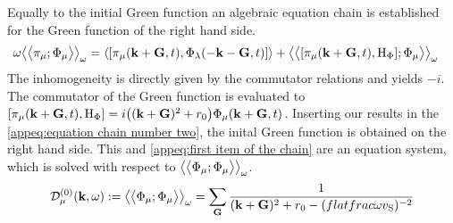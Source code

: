 %
Equally to the initial Green function an algebraic equation chain is established for the Green function of the right hand side.
%
\begin{align}
	\omega \green{\pi_{\mu}}{\Phi_{\mu}}_{\omega} &= 
		\expval{\comm{\pi_{\mu}(\vb{k}+\vb{G},t)}{\Phi_{\lambda}(-\vb{k}-\vb{G},t)}}
		+
		\green{\comm{\pi_{\mu}(\vb{k}+\vb{G},t)}{\mt{H}_{\Phi}}}{\Phi_{\mu}}_{\omega}
	\label{appeq:equation chain number two}
\end{align}
%
The inhomogeneity is directly given by the commutator relations and yields $-i$.
The commutator of the Green function is evaluated to $\comm{\pi_{\mu}(\vb{k}+\vb{G},t)}{\mt{H}_{\Phi}} = i \big((\vb{k}+\vb{G})^{2} + r_{0}\big) \Phi_{\mu}(\vb{k}+\vb{G},t)$.
Inserting our results in the \eqref{appeq:equation chain number two}, the inital Green function is obtained on the right hand side.
This and \eqref{appeq:first item of the chain} are an equation system, which is solved with respect to $\big\langle\big\langle{\Phi_{\mu}};{\Phi_{\mu}}\big\rangle\big\rangle_{\omega}$.
%
\begin{align}
	\mathcal{D}_{\mu}^{(0)}(\vb{k},\omega) := \big\langle\big\langle{\Phi_{\mu}};{\Phi_{\mu}}\big\rangle\big\rangle_{\omega} = \sum\limits_{\vb{G}} \frac{1}{(\vb{k}+\vb{G})^{2} + r_{0} - (flatfrac{\omega}{v_{\mathrm{S}}})^{-2}}
	\label{eq:free spin density wave propagator}
\end{align}
%
%
%
